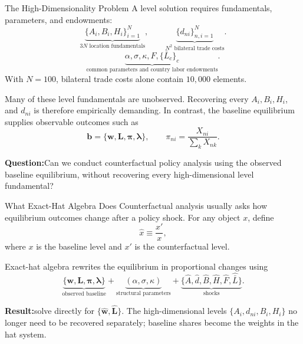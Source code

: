 \documentclass[aspectratio=169,11pt]{beamer}
\newcommand{\B}[1]{\textcolor{blue1}{\textbf{#1}}}
\newcommand{\wh}[1]{\widehat{#1}}
\begin{document}
\begin{frame}{The High-Dimensionality Problem}
  A level solution requires fundamentals, parameters, and endowments:
  \[
    \underbrace{\{A_i,B_i,H_i\}_{i=1}^{N}}_{3N\text{ location fundamentals}},
    \qquad
    \underbrace{\{d_{ni}\}_{n,i=1}^{N}}_{N^2\text{ bilateral trade costs}}.
  \]
  \[
    \underbrace{\alpha,\sigma,\kappa,F,\{\bar L_c\}_c}
      _{\text{common parameters and country labor endowments}}.
  \]
  With \(N=100\), bilateral trade costs alone contain \(10{,}000\) elements.

  \medskip
  Many of these level fundamentals are unobserved. Recovering every
  \(A_i,B_i,H_i\), and \(d_{ni}\) is therefore empirically demanding.
  In contrast, the baseline equilibrium supplies observable outcomes such as
  \[
    \mathbf b=\{\mathbf w,\mathbf L,\boldsymbol\pi,\boldsymbol\lambda\},
    \qquad
    \pi_{ni}=\frac{X_{ni}}{\sum_kX_{nk}}.
  \]

  \vfill
  \B{Question:}\quad Can we conduct counterfactual policy analysis using the
  observed baseline equilibrium, without recovering every high-dimensional
  level fundamental?
\end{frame}

\begin{frame}{What Exact-Hat Algebra Does}
  Counterfactual analysis usually asks how equilibrium outcomes change after a
  policy shock. For any object \(x\), define
  \[
    \wh x\equiv\frac{x'}{x},
  \]
  where \(x\) is the baseline level and \(x'\) is the counterfactual level.

  Exact-hat algebra rewrites the equilibrium in proportional changes using
  \[
    \underbrace{\{\mathbf w,\mathbf L,\boldsymbol\pi,
      \boldsymbol\lambda\}}_{\text{observed baseline}}
    +\underbrace{(\alpha,\sigma,\kappa)}_{\text{structural parameters}}
    +\underbrace{\{\wh A,\wh d,\wh B,\wh H,
      \wh F,\wh{\bar L}\}}_{\text{shocks}}.
  \]

  \B{Result:}\quad solve directly for \(\{\wh{\mathbf w},\wh{\mathbf L}\}\).
  The high-dimensional levels \(\{A_i,d_{ni},B_i,H_i\}\) no longer need to be
  recovered separately; baseline shares become the weights in the hat system.
\end{frame}
\end{document}
